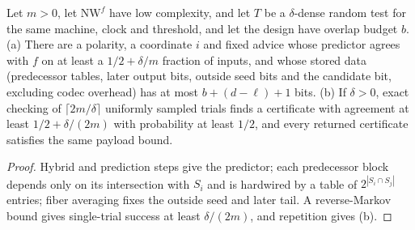 \begin{theorem}
  \label{thm:avg-nw-reconstruction}
  \leanok
  Let $m > 0$, let $\mathrm{NW}^f$ have low complexity, and let $T$ be a
  $\delta$-dense random test for the same machine, clock and threshold, and let
  the design have overlap budget $b$. (a) There are a polarity, a coordinate $i$
  and fixed advice whose predictor agrees with $f$ on at least a $1/2 +
  \delta/m$ fraction of inputs, and whose stored data (predecessor tables,
  later output bits, outside seed bits and the candidate bit, excluding codec
  overhead) has at most $b + (d - \ell) + 1$ bits.
  (b) If $\delta > 0$, exact checking of $\lceil 2m/\delta \rceil$ uniformly
  sampled trials finds a certificate with agreement at least $1/2 +
  \delta/(2m)$ with probability at least $1/2$, and every returned certificate
  satisfies the same payload bound.
\end{theorem}
\begin{proof}
  \leanok
  Hybrid and prediction steps give the predictor; each predecessor block depends
  only on its intersection with $S_i$ and is hardwired by a table of
  $2^{|S_i \cap S_j|}$ entries; fiber averaging fixes the outside seed and later
  tail. A reverse-Markov bound gives single-trial success at least
  $\delta/(2m)$, and repetition gives (b).
\end{proof}

